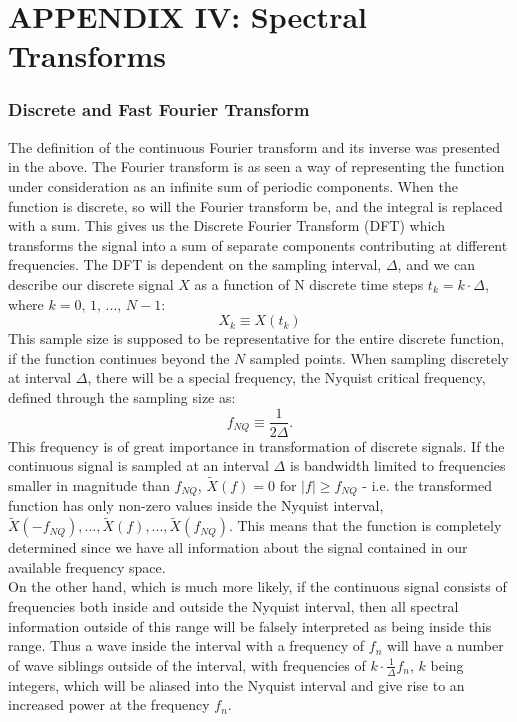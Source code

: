 \documentclass[../../CompleteThesis2/Complete_2ndDraft.tex]{subfiles}
\begin{document}
	\section[Appendix IV]{APPENDIX IV: Spectral Transforms}
	\label{AppIV:SpectralTransforms}		
	\subsubsection[DFT \& FFT][DFT \& FFT]{Discrete and Fast Fourier Transform}
	\label{Subsubsec:SignalAnalysis_BackDiffusion_SpectralAnalysis_DFTFFT}
	The definition of the continuous Fourier transform and its inverse was presented in the above. The Fourier transform is as seen a way of representing the function under consideration as an infinite sum of periodic components. When the function is discrete, so will the Fourier transform be, and the integral is replaced with a sum. This gives us the Discrete Fourier Transform (DFT) which transforms the signal into a sum of separate components contributing at different frequencies. The DFT is dependent on the sampling interval, $\Delta$, and we can describe our discrete signal $X$ as a function of N discrete time steps $t_k = k\cdot\Delta$, where $k = 0, \, 1,\, ..., \, N-1$:
	\begin{equation}
		X_k \equiv X(t_k)
		\label{Eq:DiscreteSignal}
	\end{equation}
	This sample size is supposed to be representative for the entire discrete function, if the function continues beyond the $N$ sampled points. When sampling discretely at interval $\Delta$, there will be a special frequency, the Nyquist critical frequency, defined through the sampling size as:
	\begin{equation}
		f_{NQ} \equiv \frac{1}{2\Delta}.
		\label{Eq:NyquistFreq}
	\end{equation}
	This frequency is of great importance in transformation of discrete signals. If the continuous signal is sampled at an interval $\Delta$ is bandwidth limited to frequencies smaller in magnitude than $f_{NQ}$, $\tilde{X}(f) = 0 \text{ for } |f| \geq f_{NQ}$ - i.e. the transformed function has only non-zero values inside the Nyquist interval, $\tilde{X}(-f_{NQ}), ..., \tilde{X}(f), ..., \tilde{X}(f_{NQ})$. This means that the function is completely determined since we have all information about the signal contained in our available frequency space.\\
	On the other hand, which is much more likely, if the continuous signal consists of frequencies both inside and outside the Nyquist interval, then all spectral information outside of this range will be falsely interpreted as being inside this range. Thus a wave inside the interval with a frequency of $f_n$ will have a number of wave siblings outside of the interval, with frequencies  of $k\cdot \frac{1}{\Delta} f_n$, $k$ being integers, which will be aliased into the Nyquist interval and give rise to an increased power at the frequency $f_n$.\\
\end{document}
